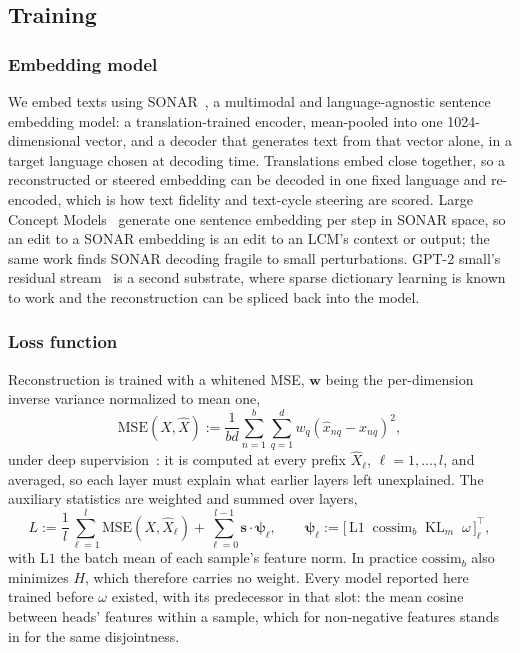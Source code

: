 \subsection{Training}
\label{sec:training}

\subsubsection{Embedding model}
\label{sec:sonar}
We embed texts using SONAR~\cite{sonar}, a multimodal and
language-agnostic sentence embedding model: a translation-trained
encoder, mean-pooled into one 1024-dimensional vector, and a decoder that
generates text from that vector alone, in a target language chosen at
decoding time. Translations embed close together, so a reconstructed or
steered embedding can be decoded in one fixed language and re-encoded,
which is how text fidelity and text-cycle steering are scored. Large
Concept Models~\cite{lcmteam2024largeconceptmodelslanguage} generate one
sentence embedding per step in SONAR space, so an edit to a SONAR
embedding is an edit to an LCM's context or output; the same work finds
SONAR decoding fragile to small perturbations. GPT-2 small's residual
stream~\cite{radford2019} is a second
substrate, where sparse dictionary learning is known to work and the
reconstruction can be spliced back into the model.

\subsubsection{Loss function}
\label{sec:loss}
Reconstruction is trained with a whitened MSE, $\mathbf{w}$ being the
per-dimension inverse variance normalized to mean one,
\begin{equation}
	\mathrm{MSE}(X,\hat{X}) := \frac{1}{bd}\sum^{b}_{n=1}\sum^{d}_{q=1}
	w_q\left(\hat{x}_{nq} - x_{nq}\right)^2,
	\label{eq:mse}
\end{equation}
under deep supervision~\cite{lee2015deeply}: it is computed at every prefix
$\hat{X}_\ell$, $\ell = 1, \dots, l$, and averaged, so each layer must explain
what earlier layers left unexplained. The auxiliary statistics are weighted
and summed over layers,
\begin{equation}
	L := \frac{1}{l}\sum^{l}_{\ell=1}\mathrm{MSE}(X,\hat{X}_\ell)
	+ \sum^{l-1}_{\ell=0}\mathbf{s}\cdot\boldsymbol{\psi}_\ell,
	\qquad
	\boldsymbol{\psi}_\ell := \big[\, \mathrm{L1} \;\; \mathrm{cossim}_b \;\;
	\mathrm{KL}_m \;\; \omega \,\big]^{\top}_\ell,
	\label{eq:loss_total}
\end{equation}
with $\mathrm{L1}$ the batch mean of each sample's feature norm. In
practice $\mathrm{cossim}_b$ also minimizes $H$, which therefore carries
no weight. Every model reported here trained before $\omega$ existed, with
its predecessor in that slot: the mean cosine between heads' features
within a sample, which for non-negative features stands in for the same
disjointness.

